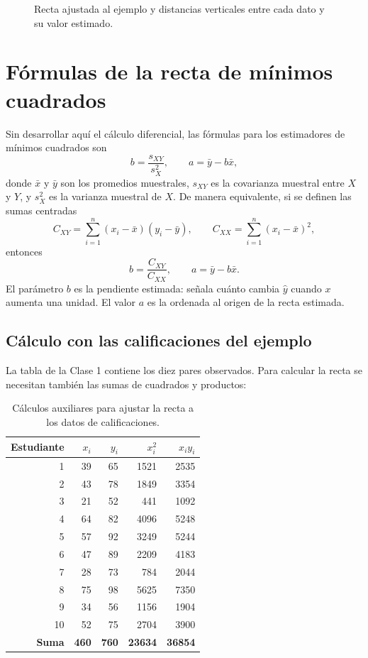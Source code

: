 \begin{figure}[H]
\centering

\caption{Recta ajustada al ejemplo y distancias verticales entre cada dato y su valor estimado.}
\label{fig:minimos-cuadrados}
\end{figure}

\section{Fórmulas de la recta de mínimos cuadrados}

Sin desarrollar aquí el cálculo diferencial, las fórmulas para los estimadores de mínimos cuadrados son
\[
b=\frac{s_{XY}}{s_X^2},\qquad a=\bar{y}-b\bar{x},
\]
donde $\bar{x}$ y $\bar{y}$ son los promedios muestrales, $s_{XY}$ es la covarianza muestral entre $X$ y $Y$, y $s_X^2$ es la varianza muestral de $X$. De manera equivalente, si se definen las sumas centradas
\[
C_{XY}=\sum_{i=1}^n(x_i-\bar{x})(y_i-\bar{y}),\qquad
C_{XX}=\sum_{i=1}^n(x_i-\bar{x})^2,
\]
entonces
\[
b=\frac{C_{XY}}{C_{XX}},\qquad a=\bar{y}-b\bar{x}.
\]
El parámetro $b$ es la pendiente estimada: señala cuánto cambia $\widehat y$ cuando $x$ aumenta una unidad. El valor $a$ es la ordenada al origen de la recta estimada.

\subsection{Cálculo con las calificaciones del ejemplo}

La tabla de la Clase 1 contiene los diez pares observados. Para calcular la recta se necesitan también las sumas de cuadrados y productos:

\begin{table}[H]
\centering
\small
\renewcommand{\arraystretch}{1.08}
\begin{tabular}{|r|r|r|r|r|}
\hline
\textbf{Estudiante} & $x_i$ & $y_i$ & $x_i^2$ & $x_iy_i$ \\ \hline
1 & 39 & 65 & 1521 & 2535 \\ \hline
2 & 43 & 78 & 1849 & 3354 \\ \hline
3 & 21 & 52 & 441 & 1092 \\ \hline
4 & 64 & 82 & 4096 & 5248 \\ \hline
5 & 57 & 92 & 3249 & 5244 \\ \hline
6 & 47 & 89 & 2209 & 4183 \\ \hline
7 & 28 & 73 & 784 & 2044 \\ \hline
8 & 75 & 98 & 5625 & 7350 \\ \hline
9 & 34 & 56 & 1156 & 1904 \\ \hline
10 & 52 & 75 & 2704 & 3900 \\ \hline
\textbf{Suma} & \textbf{460} & \textbf{760} & \textbf{23634} & \textbf{36854} \\ \hline
\end{tabular}
\caption{Cálculos auxiliares para ajustar la recta a los datos de calificaciones.}
\label{tab:calculos-regresion-simple}
\end{table}


